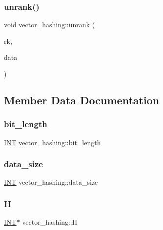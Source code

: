 \subsubsection{\texorpdfstring{unrank()}{unrank()}}
{\footnotesize\ttfamily void vector\+\_\+hashing\+::unrank (\begin{DoxyParamCaption}\item[{\mbox{\hyperlink{galois_8h_a09fddde158a3a20bd2dcadb609de11dc}{I\+NT}}}]{rk,  }\item[{\mbox{\hyperlink{galois_8h_a09fddde158a3a20bd2dcadb609de11dc}{I\+NT}} $\ast$}]{data }\end{DoxyParamCaption})}



\subsection{Member Data Documentation}
\mbox{\label{classvector__hashing_a2bfeff3ce35d212013ef702fd207849b}} 
\subsubsection{\texorpdfstring{bit\+\_\+length}{bit\_length}}
{\footnotesize\ttfamily \mbox{\hyperlink{galois_8h_a09fddde158a3a20bd2dcadb609de11dc}{I\+NT}} vector\+\_\+hashing\+::bit\+\_\+length}

\mbox{\label{classvector__hashing_aefd29dfc01954a81db98b4ccc954a02f}} 
\subsubsection{\texorpdfstring{data\+\_\+size}{data\_size}}
{\footnotesize\ttfamily \mbox{\hyperlink{galois_8h_a09fddde158a3a20bd2dcadb609de11dc}{I\+NT}} vector\+\_\+hashing\+::data\+\_\+size}

\mbox{\label{classvector__hashing_a4042f8d195a2f874da7549a0b0d67186}} 
\subsubsection{\texorpdfstring{H}{H}}
{\footnotesize\ttfamily \mbox{\hyperlink{galois_8h_a09fddde158a3a20bd2dcadb609de11dc}{I\+NT}}$\ast$ vector\+\_\+hashing\+::H}

